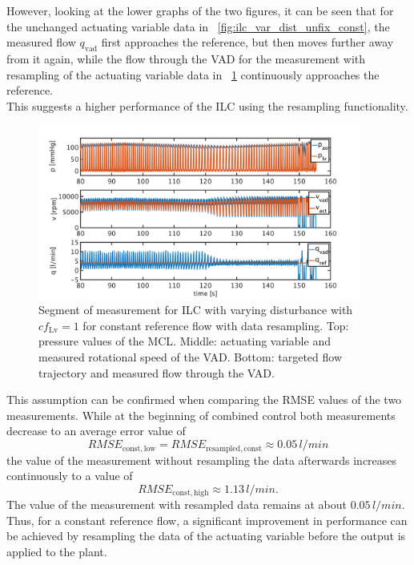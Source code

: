 However, looking at the lower graphs of the two figures, it can be seen that for the unchanged actuating variable data in \figurename~\ref{fig:ilc_var_dist_unfix_const}, the measured flow $q_{\mathrm{vad}}$ first approaches the reference, but then moves further away from it again, while the flow through the VAD for the measurement with resampling of the actuating variable data in \figurename~\ref{fig:ilc_var_dist_fix_const} continuously approaches the reference.
\\This suggests a higher performance of the ILC using the resampling functionality.
\begin{figure}[ht!]
  \centering
  \includegraphics[width=0.95\textwidth]{images/chapt_5/ILC/ilc_var_dist_fix_const.pdf}
  \caption[Segment of measurement for ILC with varying disturbance with $cf_{\mathrm{Lv}}=1$ for constant reference flow with data resampling]{Segment of measurement for ILC with varying disturbance with $cf_{\mathrm{Lv}}=1$ for constant reference flow with data resampling. Top:  pressure values of the MCL. Middle: actuating variable and measured rotational speed of the VAD. Bottom: targeted flow trajectory and measured flow through the VAD.}
  \label{fig:ilc_var_dist_fix_const}
\end{figure}
This assumption can be confirmed when comparing the RMSE values of the two measurements.
While at the beginning of combined control both measurements decrease to an average error value of
\begin{equation}
  RMSE_{\mathrm{const,low}}=RMSE_{\mathrm{resampled,const}}\approx0.05\,l/min
\end{equation}
 the value of the measurement without resampling the data afterwards increases continuously to a value of
\begin{equation}
  RMSE_{\mathrm{const,high}}\approx1.13\,l/min.
\end{equation}
The value of the measurement with resampled data remains at about $0.05\,l/min$. Thus, for a constant reference flow, a significant improvement in performance can be achieved by resampling the data of the actuating variable before the output is applied to the plant.

